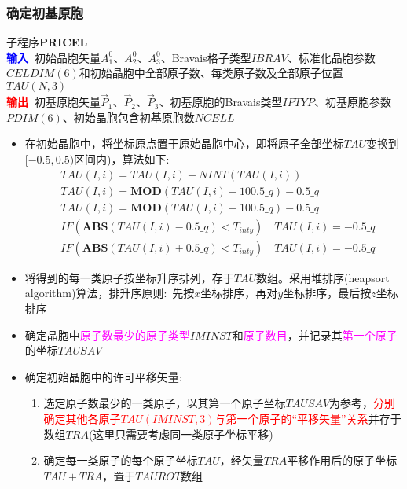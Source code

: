 \subsubsection{确定初基原胞}
子程序\textbf{PRICEL}\\
\textbf{\textcolor{blue}{输入~}}初始晶胞矢量$A^0_1$、$A^0_2$、$A^0_3$、\textrm{Bravais}格子类型$\mathit{IBRAV}$、标准化晶胞参数$\mathit{CELDIM}(6)$和初始晶胞中全部原子数、每类原子数及全部原子位置$\mathit{TAU}(N,3)$\\
\textbf{\textcolor{red}{输出~}}初基原胞矢量$\vec P_1$、$\vec P_2$、$\vec P_3$、初基原胞的\textrm{Bravais}类型$\mathit{IPTYP}$、初基原胞参数$\mathit{PDIM}(6)$、初始晶胞包含初基原胞数$\mathit{NCELL}$
\begin{itemize}
	\item 在初始晶胞中，将坐标原点置于原始晶胞中心，即将原子全部坐标$\mathit{TAU}$变换到$[-0.5,0.5)$区间内)，算法如下:
			\begin{displaymath}
				\begin{aligned}
					&TAU(I,i)=TAU(I,i)-NINT(TAU(I,i)) \\
					&TAU(I,i)=\mathbf{MOD}(TAU(I,i)+100.5\_q)-0.5\_q \\
					&TAU(I,i)=\mathbf{MOD}(TAU(I,i)+100.5\_q)-0.5\_q \\
					&IF (\mathbf{ABS}(TAU(I,i)-0.5\_q)<T_{inty})\quad TAU(I,i)=-0.5\_q \\
					&IF (\mathbf{ABS}(TAU(I,i)+0.5\_q)<T_{inty})\quad TAU(I,i)=-0.5\_q
				\end{aligned}
			\end{displaymath}
	\item 将得到的每一类原子按坐标升序排列，存于$\mathit{TAU}$数组。采用堆排序\textrm{(heapsort algorithm)}算法，排升序原则:~先按$x$坐标排序，再对$y$坐标排序，最后按$z$坐标排序
	\item 确定晶胞中\textcolor{magenta}{原子数最少的原子类型}$\mathit{IMINST}$和\textcolor{magenta}{原子数目}，并记录其\textcolor{magenta}{第一个原子}的坐标$\mathit{TAUSAV}$
	\item 确定初始晶胞中的许可平移矢量:~
		\begin{enumerate}
			\item 选定原子数最少的一类原子，以其第一个原子坐标$\mathit{TAUSAV}$为参考，\textcolor{red}{分别确定其他各原子$\mathit{TAU}(IMINST,3)$与第一个原子的“平移矢量”关系}并存于数组$\mathit{TRA}$(这里只需要考虑同一类原子坐标平移)
			\item 确定每一类原子的每个原子坐标$\mathit{TAU}$，经矢量$\mathit{TRA}$平移作用后的原子坐标$\mathit{TAU}+\mathit{TRA}$，置于$\mathit{TAUROT}$数组

\end{enumerate}
\end{itemize}
